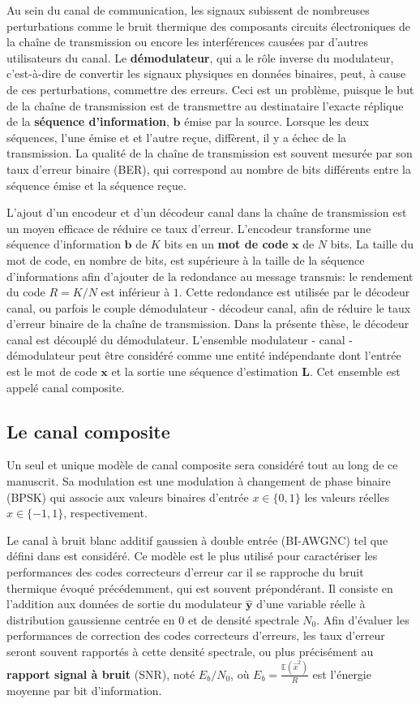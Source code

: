 Au sein du canal de communication, les signaux subissent de nombreuses perturbations comme le bruit thermique des composants circuits électroniques de la chaîne de transmission ou encore les interférences causées par d'autres utilisateurs du canal. Le \textbf{démodulateur}, qui a le rôle inverse du modulateur, c'est-à-dire de convertir les signaux physiques en données binaires, peut, à cause de ces perturbations, commettre des erreurs. Ceci est un problème, puisque le but de la chaîne de transmission est de transmettre au destinataire l'exacte réplique de la \textbf{séquence d'information}, $\mathbold{b}$ émise par la source. Lorsque les deux séquences, l'une émise et et l'autre reçue, diffèrent, il y a échec de la transmission. La qualité de la chaîne de transmission est souvent mesurée par son taux d'erreur binaire (BER), qui correspond au nombre de bits différents entre la séquence émise et la séquence reçue.

L'ajout d'un encodeur et d'un décodeur canal dans la chaîne de transmission est un moyen efficace de réduire ce taux d'erreur. L'encodeur transforme une séquence d'information $\mathbold{b}$ de $K$ bits en un \textbf{mot de code} $\mathbold{x}$ de $N$ bits. La taille du mot de code, en nombre de bits, est supérieure à la taille de la séquence d'informations afin d'ajouter de la redondance au message transmis: le rendement du code $R=K/N$ est inférieur à $1$. Cette redondance est utilisée par le décodeur canal, ou parfois le couple démodulateur - décodeur canal, afin de réduire le taux d'erreur binaire de la chaîne de transmission. Dans la présente thèse, le décodeur canal est découplé du démodulateur. L'ensemble modulateur - canal - démodulateur peut être considéré comme une entité indépendante dont l'entrée est le mot de code $\mathbold{x}$ et la sortie une séquence d'estimation $\mathbold{L}$. Cet ensemble est appelé canal composite.

\subsection{Le canal composite}
Un seul et unique modèle de canal composite sera considéré tout au long de ce manuscrit. Sa modulation est une modulation à changement de phase binaire (BPSK) qui associe aux valeurs binaires d'entrée $x\in\{0,1\}$ les valeurs réelles $\hat{x}\in\{-1,1\}$, respectivement.

Le canal à bruit blanc additif gaussien à double entrée (BI-AWGNC) tel que défini dans \cite[Section~1.5.1.3]{ryan2009channel} est considéré. Ce modèle est le plus utilisé pour caractériser les performances des codes correcteurs d'erreur car il se rapproche du bruit thermique évoqué précédemment, qui est souvent prépondérant. Il consiste en l'addition aux données de sortie du modulateur $\mathbold{\hat{y}}$ d'une variable réelle à distribution gaussienne centrée en $0$ et de densité spectrale $N_0$. Afin d'évaluer les performances de correction des codes correcteurs d'erreurs, les taux d'erreur seront souvent rapportés à cette densité spectrale, ou plus précisément au \textbf{rapport signal à bruit} (SNR), noté $E_b/N_0$, où $E_b=\frac{\mathbb{E}(\hat{x}^2)}{R}$ est l'énergie moyenne par bit d'information.

